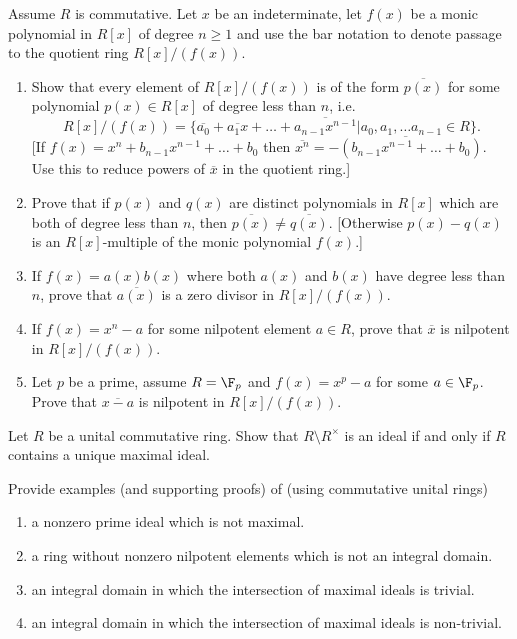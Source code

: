 \begin{problem}
Assume \( R \) is commutative. Let \( x \) be an indeterminate, let \( f(x) \) be a monic polynomial in \( R[x] \) of degree \( n \geq 1 \) and use the bar notation to denote passage to the quotient ring \( R[x] / (f(x)) \).
\begin{enumerate}[a]
\item
Show that every element of \( R[x] / (f(x)) \) is of the form  \( \overline{p(x)} \) for some polynomial \( p(x) \in R[x] \) of degree less than \( n \), i.e.
\[ R[x] / (f(x)) = \{ \overline{a_0} +  \overline{a_1x} + \dots +  \overline{a_{n-1}x^{n-1}} | a_0, a_1, \dots a_{n-1} \in R \}. \]
[If \(f(x) = x^n + b_{n-1}x^{n-1} + \dots + b_0\) then \(\overline{x^n} = \overline{-(b_{n-1}x^{n-1} + \dots + b_0)}\). Use this to reduce powers of \( \overline{x} \) in the quotient ring.]
\item
Prove that if \( p(x) \) and \( q(x) \) are distinct polynomials in \( R[x] \) which are both of degree less than \( n \), then \( \overline{p(x)} \neq \overline{q(x)} \). [Otherwise \( p(x) - q(x) \) is an \( R[x] \)-multiple of the monic polynomial \( f(x) \).]
\item
If \( f(x) = a(x)b(x) \) where both \( a(x) \) and \( b(x) \) have degree less than \( n \), prove that \( \overline{a(x)} \) is a zero divisor in \( R[x] / (f(x)) \).
\item
If \( f(x) = x^n - a \) for some nilpotent element \( a \in R \), prove that \( \overline{x} \) is nilpotent in \( R[x] / (f(x)) \).
\item
Let \( p \) be a prime, assume \( R = \F_p \) and \( f(x) = x^p - a \) for some \( a \in \F_p \). Prove that \( \overline{x-a} \) is nilpotent in \( R[x] / (f(x)) \).
\end{enumerate}
\end{problem}

\begin{problem}
Let \( R \) be a unital commutative ring. Show that \( R \setminus R^\times \) is an ideal if and only if \( R \) contains a unique maximal ideal.
\end{problem}

\begin{problem}
Provide examples (and supporting proofs) of (using commutative unital rings)
\begin{enumerate}[1]
\item
a nonzero prime ideal which is not maximal.
\item
a ring without nonzero nilpotent elements which is not an integral domain.
\item
an integral domain in which the intersection of maximal ideals is trivial.
\item
an integral domain in which the intersection of maximal ideals is non-trivial.
\end{enumerate}
\end{problem}

